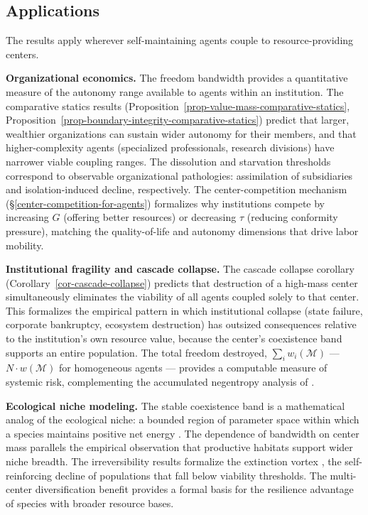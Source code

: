 \documentclass[11pt]{article}
\theoremstyle{plain}
\theoremstyle{definition}
\theoremstyle{remark}
\let\origsubsection\subsection
\renewcommand{\subsection}{\needspace{7\baselineskip}\origsubsection}
\begin{document}
\subsection{Applications}\label{applications}

The results apply wherever self-maintaining agents couple to
resource-providing centers.

\textbf{Organizational economics.} The freedom bandwidth provides a
quantitative measure of the autonomy range available to agents within an
institution. The comparative statics results
(Proposition~\ref{prop-value-mass-comparative-statics},
Proposition~\ref{prop-boundary-integrity-comparative-statics}) predict
that larger, wealthier organizations can sustain wider autonomy for
their members, and that higher-complexity agents (specialized
professionals, research divisions) have narrower viable coupling ranges.
The dissolution and starvation thresholds correspond to observable
organizational pathologies: assimilation of subsidiaries and
isolation-induced decline, respectively. The center-competition
mechanism (§\ref{center-competition-for-agents}) formalizes why
institutions compete by increasing \(G\) (offering better resources) or
decreasing \(\tau\) (reducing conformity pressure), matching the
quality-of-life and autonomy dimensions that drive labor mobility.

\textbf{Institutional fragility and cascade collapse.} The cascade
collapse corollary (Corollary~\ref{cor-cascade-collapse}) predicts that
destruction of a high-mass center simultaneously eliminates the
viability of all agents coupled solely to that center. This formalizes
the empirical pattern in which institutional collapse (state failure,
corporate bankruptcy, ecosystem destruction) has outsized consequences
relative to the institution's own resource value, because the center's
coexistence band supports an entire population. The total freedom
destroyed, \(\sum_i w_i(\mathcal{M})\) --- \(N \cdot w(\mathcal{M})\)
for homogeneous agents --- provides a computable measure of systemic
risk, complementing the accumulated negentropy analysis of
\citep{TC-III}.

\textbf{Ecological niche modeling.} The stable coexistence band is a
mathematical analog of the ecological niche: a bounded region of
parameter space within which a species maintains positive net energy
\citep{Tilman1982}. The dependence of bandwidth on center mass parallels
the empirical observation that productive habitats support wider niche
breadth. The irreversibility results formalize the extinction vortex
\citep{Gilpin1986}, the self-reinforcing decline of populations that
fall below viability thresholds. The multi-center diversification
benefit provides a formal basis for the resilience advantage of species
with broader resource bases.
\end{document}
